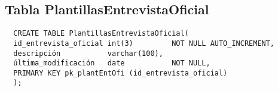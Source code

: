 \subsection{Tabla PlantillasEntrevistaOficial}

\begin{verbatim}
  CREATE TABLE PlantillasEntrevistaOficial(
  id_entrevista_oficial int(3)         NOT NULL AUTO_INCREMENT,
  descripción           varchar(100),
  última_modificación   date           NOT NULL,
  PRIMARY KEY pk_plantEntOfi (id_entrevista_oficial)
  );
\end{verbatim}